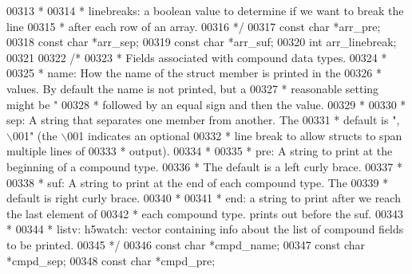 \begin{DoxyCode}
{{{{{{{{{{{{{00313 \textcolor{comment}{     *}
00314 \textcolor{comment}{     *   linebreaks: a boolean value to determine if we want to break the line}
00315 \textcolor{comment}{     *               after each row of an array.}
00316 \textcolor{comment}{     */}
00317     \textcolor{keyword}{const} \textcolor{keywordtype}{char}  *arr\_pre;
00318     \textcolor{keyword}{const} \textcolor{keywordtype}{char}  *arr\_sep;
00319     \textcolor{keyword}{const} \textcolor{keywordtype}{char}  *arr\_suf;
00320     \textcolor{keywordtype}{int}         arr\_linebreak;
00321 
00322     \textcolor{comment}{/*}
00323 \textcolor{comment}{     * Fields associated with compound data types.}
00324 \textcolor{comment}{     *}
00325 \textcolor{comment}{     *   name:      How the name of the struct member is printed in the}
00326 \textcolor{comment}{     *              values. By default the name is not printed, but a}
00327 \textcolor{comment}{     *              reasonable setting might be "%
00328 \textcolor{comment}{     *              followed by an equal sign and then the value.}
00329 \textcolor{comment}{     *}
00330 \textcolor{comment}{     *   sep:       A string that separates one member from another.  The}
00331 \textcolor{comment}{     *              default is ", \(\backslash\)001" (the \(\backslash\)001 indicates an optional}
00332 \textcolor{comment}{     *              line break to allow structs to span multiple lines of}
00333 \textcolor{comment}{     *              output).}
00334 \textcolor{comment}{     *}
00335 \textcolor{comment}{     *   pre:       A string to print at the beginning of a compound type.}
00336 \textcolor{comment}{     *              The default is a left curly brace.}
00337 \textcolor{comment}{     *}
00338 \textcolor{comment}{     *   suf:       A string to print at the end of each compound type.  The}
00339 \textcolor{comment}{     *              default is  right curly brace.}
00340 \textcolor{comment}{     *}
00341 \textcolor{comment}{     *   end:       a string to print after we reach the last element of}
00342 \textcolor{comment}{     *              each compound type. prints out before the suf.}
00343 \textcolor{comment}{     *}
00344 \textcolor{comment}{     *   listv:    h5watch: vector containing info about the list of compound fields to be printed.}
00345 \textcolor{comment}{     */}
00346     \textcolor{keyword}{const} \textcolor{keywordtype}{char}  *cmpd\_name;
00347     \textcolor{keyword}{const} \textcolor{keywordtype}{char}  *cmpd\_sep;
00348     \textcolor{keyword}{const} \textcolor{keywordtype}{char}  *cmpd\_pre;
}}}}}}}}}}}}}}
\end{DoxyCode}
